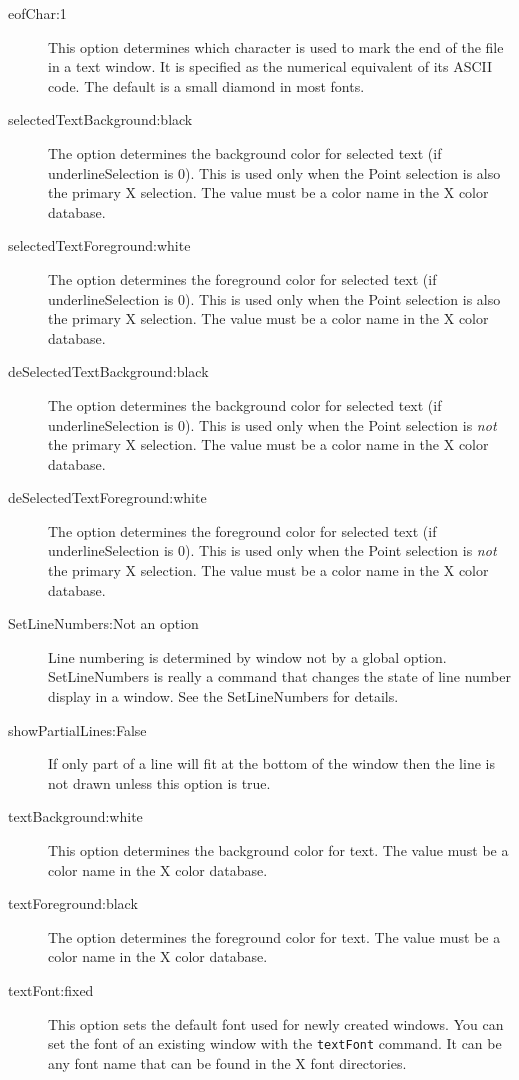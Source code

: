 \begin{description}

\item[eofChar:1]
This option determines which character is used to mark the end of
the file in a text window.
It is specified as the numerical equivalent of its ASCII code.
The default is a small diamond in most fonts.

\item[selectedTextBackground:black]
The option determines the background color for selected text
(if underlineSelection is 0).
This is used only when the Point selection is also the primary X selection.
The value must be a color name in the X color database.

\item[selectedTextForeground:white]
The option determines the foreground color for selected text
(if underlineSelection is 0).
This is used only when the Point selection is also the primary X selection.
The value must be a color name in the X color database.

\item[deSelectedTextBackground:black]
The option determines the background color for selected text
(if underlineSelection is 0).
This is used only when the Point selection is {\it not}
the primary X selection.
The value must be a color name in the X color database.

\item[deSelectedTextForeground:white]
The option determines the foreground color for selected text
(if underlineSelection is 0).
This is used only when the Point selection is {\it not}
the primary X selection.
The value must be a color name in the X color database.

\item[SetLineNumbers:Not an option]
Line numbering is determined by window not by a global option.
SetLineNumbers is really a command that changes the state
of line number display in a window.
See the SetLineNumbers for details.

\item[showPartialLines:False]
If only part of a line will fit at the bottom of the window
then the line is not drawn unless this option is true.

\item[textBackground:white]
This option determines the background color for text.
The value must be a color name in the X color database.

\item[textForeground:black]
The option determines the foreground color for text.
The value must be a color name in the X color database.

\item[textFont:fixed]
This option sets the default font used for newly created windows.
You can set the font of an existing window with the {\tt textFont}
command.
It can be any font name that can be found in the X font directories.

\end{description}




